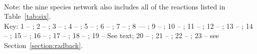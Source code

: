 \begin{table}
\begin{tabular}{lclcc}
\hline
\end{tabular}
\\ Note: the nine species network also includes all of the reactions listed in Table~\ref{tab:six}.
\\ Key: 1 -- \citet{1979MNRAS.187P..59W}; 2 -- \citet{1998ApJ...509....1S}; 3 -- \citet{2010Sci...329...69K}; 4 -- \citet{1976PhRvA..13...58R}; 5 -- \citet{2015MNRAS.446.3163L}; 6 -- \citet{1979JChPh..70.2877K}; 7 -- \citet{2002PhRvA..66d2717K}; 8 --- \citet{2004ApJ...606L.167S,2004ApJ...607L.147S}; 9 -- \citet{2002PPCF...44.1263T}; 10 -- \citet{1996ApJ...461..265M}; 11 -- \citet{1987ephh.book.....J}; 12 -- \citet{1997NewA....2..181A}; 13 -- \citet{1986JPhB...19L..31F}; 14 -- \citet{1999MNRAS.304..327C}; 15 -- \citet{1978JPhB...11L.671P}; 16 -- \citet{1987ApJ...318...32S}; 17 -- \citet{1994ApJ...424..983S}; 18 -- \citet{1987IAUS..120..109D}; 19 -- See text; 20 -- \citet{1962JChPh..36.2923S}; 21 -- \citet{1970JChPh..53.4395H}; 22 -- \citet{1983JPCRD..12..531C}; 23 -- see Section~\ref{section:radback}.
\end{table}

